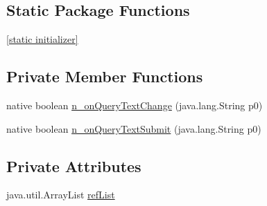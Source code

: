 \subsection*{Static Package Functions}
\begin{CompactItemize}
\item 
\hyperlink{classmono_1_1android_1_1support_1_1v7_1_1widget_1_1_search_view___on_query_text_listener_implementor_85b90afa40d8fc359210fdfb830359c4}{\mbox{[}static initializer\mbox{]}}
\end{CompactItemize}
\subsection*{Private Member Functions}
\begin{CompactItemize}
\item 
native boolean \hyperlink{classmono_1_1android_1_1support_1_1v7_1_1widget_1_1_search_view___on_query_text_listener_implementor_6f41e9b8a44bb5e4955cff1991309746}{n\_\-onQueryTextChange} (java.lang.String p0)
\item 
native boolean \hyperlink{classmono_1_1android_1_1support_1_1v7_1_1widget_1_1_search_view___on_query_text_listener_implementor_375242d4d4cea88b690fbdd54dd8649a}{n\_\-onQueryTextSubmit} (java.lang.String p0)
\end{CompactItemize}
\subsection*{Private Attributes}
\begin{CompactItemize}
\item 
java.util.ArrayList \hyperlink{classmono_1_1android_1_1support_1_1v7_1_1widget_1_1_search_view___on_query_text_listener_implementor_408d8023bd202047f472d989dd561fba}{refList}
\end{CompactItemize}


